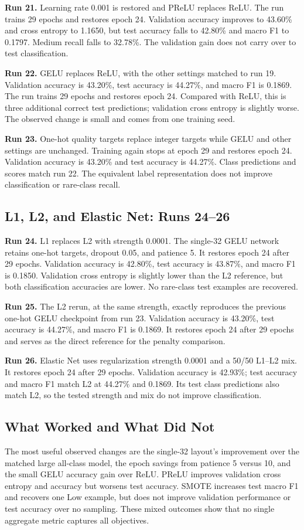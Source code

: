 \documentclass[11pt,letterpaper]{article}
\newcommand{\run}[1]{\textbf{Run #1.}}
\begin{document}
\run{21} Learning rate 0.001 is restored and PReLU replaces ReLU. The run trains 29 epochs and restores epoch 24. Validation accuracy improves to 43.60\% and cross entropy to 1.1650, but test accuracy falls to 42.80\% and macro F1 to 0.1797. Medium recall falls to 32.78\%. The validation gain does not carry over to test classification.

\run{22} GELU replaces ReLU, with the other settings matched to run 19. Validation accuracy is 43.20\%, test accuracy is 44.27\%, and macro F1 is 0.1869. The run trains 29 epochs and restores epoch 24. Compared with ReLU, this is three additional correct test predictions; validation cross entropy is slightly worse. The observed change is small and comes from one training seed.

\run{23} One-hot quality targets replace integer targets while GELU and other settings are unchanged. Training again stops at epoch 29 and restores epoch 24. Validation accuracy is 43.20\% and test accuracy is 44.27\%. Class predictions and scores match run 22. The equivalent label representation does not improve classification or rare-class recall.

\subsection{L1, L2, and Elastic Net: Runs 24--26}
\run{24} L1 replaces L2 with strength 0.0001. The single-32 GELU network retains one-hot targets, dropout 0.05, and patience 5. It restores epoch 24 after 29 epochs. Validation accuracy is 42.80\%, test accuracy is 43.87\%, and macro F1 is 0.1850. Validation cross entropy is slightly lower than the L2 reference, but both classification accuracies are lower. No rare-class test examples are recovered.

\run{25} The L2 rerun, at the same strength, exactly reproduces the previous one-hot GELU checkpoint from run 23. Validation accuracy is 43.20\%, test accuracy is 44.27\%, and macro F1 is 0.1869. It restores epoch 24 after 29 epochs and serves as the direct reference for the penalty comparison.

\run{26} Elastic Net uses regularization strength 0.0001 and a 50/50 L1--L2 mix. It restores epoch 24 after 29 epochs. Validation accuracy is 42.93\%; test accuracy and macro F1 match L2 at 44.27\% and 0.1869. Its test class predictions also match L2, so the tested strength and mix do not improve classification.

\subsection{What Worked and What Did Not}
The most useful observed changes are the single-32 layout's improvement over the matched large all-class model, the epoch savings from patience 5 versus 10, and the small GELU accuracy gain over ReLU. PReLU improves validation cross entropy and accuracy but worsens test accuracy. SMOTE increases test macro F1 and recovers one Low example, but does not improve validation performance or test accuracy over no sampling. These mixed outcomes show that no single aggregate metric captures all objectives.
\end{document}
